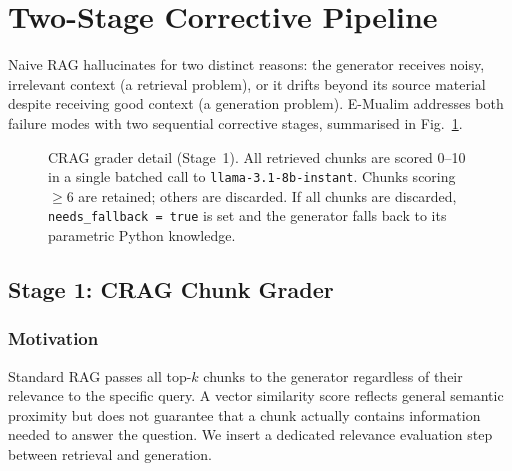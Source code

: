 \documentclass[conference]{IEEEtran}
\begin{document}

\section{Two-Stage Corrective Pipeline}
\label{sec:method}

Naive RAG hallucinates for two distinct reasons: the generator
receives noisy, irrelevant context (a retrieval problem), or it
drifts beyond its source material despite receiving good context
(a generation problem).
E-Mualim addresses both failure modes with two sequential corrective
stages, summarised in Fig.~\ref{fig:crag_grader}.

\begin{figure}[htbp]
  \centering
  \fbox{\rule{0pt}{4.2cm}\rule{\dimexpr\columnwidth-2\fboxsep\relax}{0pt}}
  \caption{CRAG grader detail (Stage~1). All retrieved chunks are
  scored 0--10 in a single batched call to
  \texttt{llama-3.1-8b-instant}. Chunks scoring $\geq 6$ are
  retained; others are discarded. If all chunks are discarded,
  \texttt{needs\_fallback = true} is set and the generator falls back
  to its parametric Python knowledge.}
  \label{fig:crag_grader}
\end{figure}

\subsection{Stage 1: CRAG Chunk Grader}

\subsubsection{Motivation}
Standard RAG passes all top-$k$ chunks to the generator regardless
of their relevance to the specific query.
A vector similarity score reflects general semantic proximity but
does not guarantee that a chunk actually contains information
needed to answer the question.
We insert a dedicated relevance evaluation step between retrieval
and generation.
\end{document}
